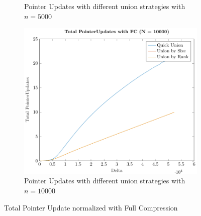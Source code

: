 \begin{figure}[ht]
\begin{subfigure}{0.32\textwidth}
        \caption{Pointer Updates with different union strategies with $n = 5000$}
    \end{subfigure}%
    \hfill
    \begin{subfigure}{0.32\textwidth}
        \centering
        \includegraphics[width=\textwidth]{../images/plotFCFull10000_PointerUpdates.pdf}
        \caption{Pointer Updates with different union strategies with $n = 10000$}
    \end{subfigure}

    \caption{Total Pointer Update normalized with Full Compression}
    \label{fig:tpuFC}
\end{figure}


